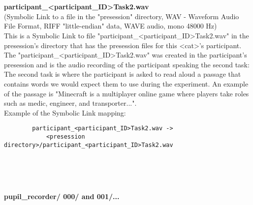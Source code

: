\begin{description}
\begin{addmargin}[0em]{0em}
    \textbf{\\\\}
    \begin{addmargin}[1em]{0em} %
        \label{participant_<participant_ID>Task2.wav}
        \textbf{participant\_<participant\_ID>Task2.wav}\\
        (Symbolic Link to a file in the "presession" directory,
        WAV - Waveform Audio File Format, RIFF "little-endian" data, WAVE audio, mono 48000 Hz)\\
        This is a Symbolic Link to file "participant\_<participant\_ID>Task2.wav" in the presession's directory
        that has the presession files for this <cat>'s participant.\\
        The "participant\_<participant\_ID>Task2.wav" was created in the participant's presession and is the audio recording
        of the participant speaking the second task:\\
        The second task is where the participant is asked to read aloud a passage that contains words we would expect them
        to use during the experiment. An example of the passage is "Minecraft is a multiplayer online game where players
        take roles such as medic, engineer, and transporter...".\\ 
        Example of the Symbolic Link mapping:
        \begin{verbatim}
        participant_<participant_ID>Task2.wav ->
            <presession directory>/participant_<participant_ID>Task2.wav
        \end{verbatim}  
    \end{addmargin} %
\end{addmargin} %


\textbf{\\\\\\}
\begin{addmargin}[0em]{0em} %
    \textbf{pupil\_recorder/ 000/ and 001/... }


\end{addmargin}
\end{description}

